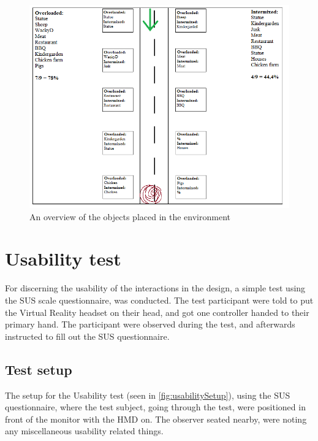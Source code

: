  \begin{figure}[H]
        	\centering
        	\includegraphics[width=0.9\linewidth]{figure/Design/Designpic4.png}
        	\caption{An overview of the objects placed in the environment}
        	\label{fig:designpic4}
        \end{figure}


\section{Usability test}
    For discerning the usability of the interactions in the design, a simple test using the SUS scale questionnaire, was conducted. The test participant were told to put the Virtual Reality headset on their head, and got one controller handed to their primary hand. The participant were observed during the test, and afterwards instructed to fill out the SUS questionnaire.
    
\subsection{Test setup}
    The setup for the Usability test (seen in \autoref{fig:usabilitySetup}), using the SUS questionnaire, where the test subject, going through the test, were positioned in front of the monitor with the HMD on. The observer seated nearby, were noting any miscellaneous usability related things.
    
